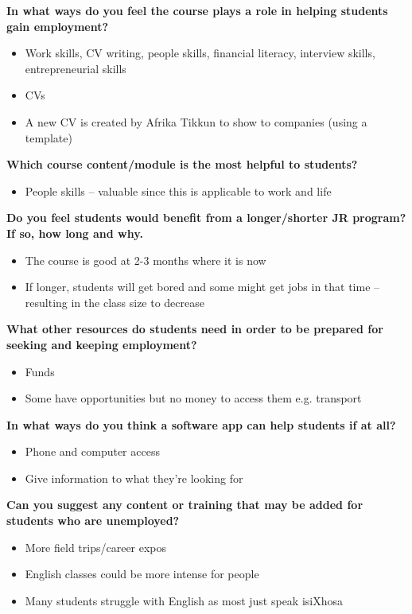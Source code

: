 

\noindent\textbf{In what ways do you feel the course plays a role in helping students gain employment?}
\begin{itemize}
\item Work skills, CV writing, people skills, financial literacy, interview skills, entrepreneurial skills
\item CVs
\item A new CV is created by Afrika Tikkun to show to companies (using a template)
\end{itemize}

\noindent\textbf{Which course content/module is the most helpful to students?}
\begin{itemize}
\item People skills – valuable since this is applicable to work and life
\end{itemize}

\noindent\textbf{Do you feel students would benefit from a longer/shorter JR program? If so, how long and why.}
\begin{itemize}
\item The course is good at 2-3 months where it is now
\item If longer, students will get bored and some might get jobs in that time – resulting in the class size to decrease
\end{itemize}

\noindent\textbf{What other resources do students need in order to be prepared for seeking and keeping employment?}
\begin{itemize}
\item Funds
\item Some have opportunities but no money to access them e.g. transport
\end{itemize}

\noindent\textbf{In what ways do you think a software app can help students if at all?}
\begin{itemize}
\item Phone and computer access
\item Give information to what they’re looking for
\end{itemize}

\noindent\textbf{Can you suggest any content or training that may be added for students who are unemployed?}
\begin{itemize}
\item More field trips/career expos
\item English classes could be more intense for people
\item Many students struggle with English as most just speak isiXhosa
\end{itemize}


